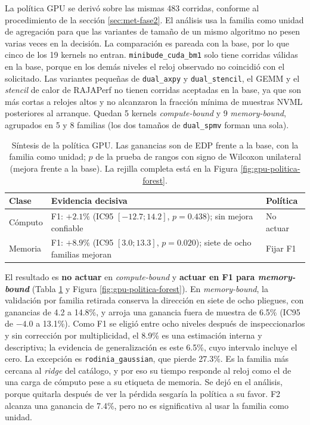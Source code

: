 La política GPU se derivó sobre las mismas 483 corridas, conforme al procedimiento de la sección \ref{sec:met-fase2}. El análisis usa la familia como unidad de agregación para que las variantes de tamaño de un mismo algoritmo no pesen varias veces en la decisión. La comparación es pareada con la base, por lo que cinco de los 19 kernels no entran. \texttt{minibude\_cuda\_bm1} solo tiene corridas válidas en la base, porque en los demás niveles el reloj observado no coincidió con el solicitado. Las variantes pequeñas de \texttt{dual\_axpy} y \texttt{dual\_stencil}, el GEMM y el \textit{stencil} de calor de RAJAPerf no tienen corridas aceptadas en la base, ya que son más cortas a relojes altos y no alcanzaron la fracción mínima de muestras NVML posteriores al arranque. Quedan 5 kernels \textit{compute-bound} y 9 \textit{memory-bound}, agrupados en 5 y 8 familias (los dos tamaños de \texttt{dual\_spmv} forman una sola).

\begin{table}[H]
\centering
\caption[Síntesis de la política GPU]{Síntesis de la política GPU. Las ganancias son de EDP frente a la base, con la familia como unidad; $p$ de la prueba de rangos con signo de Wilcoxon unilateral (mejora frente a la base). La rejilla completa está en la Figura \ref{fig:gpu-politica-forest}.}
\label{tab:gpu-politica-ic}
\small
\begin{tabular}{@{}p{2.5cm}p{7.7cm}p{3.1cm}@{}}
\toprule
\textbf{Clase} & \textbf{Evidencia decisiva} & \textbf{Política} \\
\midrule
Cómputo & F1: $+2.1\%$ (IC95 $[-12.7;14.2]$, $p=0.438$); sin mejora confiable & No actuar \\
Memoria & F1: $+8.9\%$ (IC95 $[3.0;13.3]$, $p=0.020$); siete de ocho familias mejoran & Fijar F1 \\
\bottomrule
\end{tabular}
\end{table}



El resultado es \textbf{no actuar} en \textit{compute-bound} y \textbf{actuar en F1 para \textit{memory-bound}} (Tabla \ref{tab:gpu-politica-ic} y Figura \ref{fig:gpu-politica-forest}). En \textit{memory-bound}, la validación por familia retirada conserva la dirección en siete de ocho pliegues, con ganancias de 4.2 a 14.8\%, y arroja una ganancia fuera de muestra de 6.5\% (IC95 de $-4.0$ a 13.1\%). Como F1 se eligió entre ocho niveles después de inspeccionarlos y sin corrección por multiplicidad, el 8.9\% es una estimación interna y descriptiva; la evidencia de generalización es este 6.5\%, cuyo intervalo incluye el cero. La excepción es \texttt{rodinia\_gaussian}, que pierde 27.3\%. Es la familia más cercana al \textit{ridge} del catálogo, y por eso su tiempo responde al reloj como el de una carga de cómputo pese a su etiqueta de memoria. Se dejó en el análisis, porque quitarla después de ver la pérdida sesgaría la política a su favor. F2 alcanza una ganancia de 7.4\%, pero no es significativa al usar la familia como unidad.

